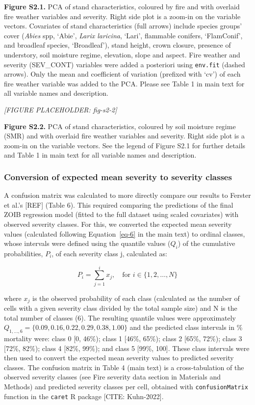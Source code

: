 \documentclass[
  numafflabel,
  authoryear,
  preprint]{elsarticle}
\begin{document}
\textbf{Figure S2.1.} PCA of stand characteristics, coloured by fire and
with overlaid fire weather variables and severity. Right side plot is a
zoom-in on the variable vectors. Covariates of stand characteristics
(full arrows) include species groups' cover (\emph{Abies} spp, `Abie',
\emph{Larix laricina}, `Lari', flammable conifers, `FlamConif', and
broadleaf species, `Broadleaf'), stand height, crown closure, presence
of understory, soil moisture regime, elevation, slope and aspect. Fire
weather and severity (SEV\_CONT) variables were added a posteriori using
\texttt{env.fit} (dashed arrows). Only the mean and coefficient of
variation (prefixed with `cv') of each fire weather variable was added
to the PCA. Please see Table 1 in main text for all variable names and
description.

\newpage{}

\emph{{[}FIGURE PLACEHOLDER: fig-s2-2{]}}

\textbf{Figure S2.2.} PCA of stand characteristics, coloured by soil
moisture regime (SMR) and with overlaid fire weather variables and
severity. Right side plot is a zoom-in on the variable vectors. See the
legend of Figure S2.1 for further details and Table 1 in main text for
all variable names and description.

\subsubsection{Conversion of expected mean severity to severity
classes}\label{conversion-of-expected-mean-severity-to-severity-classes}

A confusion matrix was calculated to more directly compare our results
to Ferster et al.'s {[}REF{]} (Table 6). This required comparing the
predictions of the final ZOIB regression model (fitted to the full
dataset using scaled covariates) with observed severity classes. For
this, we converted the expected mean severity values (calculated
following Equation~\ref{eq-6} in the main text) to ordinal classes,
whose intervals were defined using the quantile values (\(Q_i\)) of the
cumulative probabilities, \(P_i\), of each severity class j, calculated
as:

\[
P_i = \sum_{j=1}^{i} x_j, \quad \text{for } i \in \{1, 2, \ldots, N\}
\]

where \(x_j\) is the observed probability of each class (calculated as
the number of cells with a given severity class divided by the total
sample size) and N is the total number of classes (6). The resulting
quantile values were approximately
\(Q_{1,\ldots,6} = \{0.09, 0.16, 0.22, 0.29, 0.38, 1.00\}\) and the
predicted class intervals in \% mortality were: class 0 {[}0, 46\%);
class 1 {[}46\%, 65\%); class 2 {[}65\%, 72\%); class 3 {[}72\%, 82\%);
class 4 {[}82\%, 99\%); and class 5 {[}99\%, 100{]}. These class
intervals were then used to convert the expected mean severity values to
predicted severity classes. The confusion matrix in Table 4 (main text)
is a cross-tabulation of the observed severity classes (see Fire
severity data section in Materials and Methods) and predicted severity
classes per cell, obtained with \texttt{confusionMatrix} function in the
\texttt{caret} R package {[}CITE: Kuhn-2022{]}.
\end{document}
